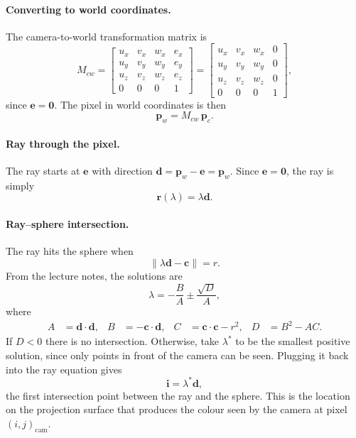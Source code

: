 \documentclass[11pt]{article}
\newcommand{\vect}[1]{\mathbf{#1}}
\begin{document}
\paragraph{Converting to world coordinates.}
The camera-to-world transformation matrix is
\[
  M_{cw} =
  \begin{bmatrix}
    u_x & v_x & w_x & e_x \\
    u_y & v_y & w_y & e_y \\
    u_z & v_z & w_z & e_z \\
    0   & 0   & 0   & 1
  \end{bmatrix}
  =
  \begin{bmatrix}
    u_x & v_x & w_x & 0 \\
    u_y & v_y & w_y & 0 \\
    u_z & v_z & w_z & 0 \\
    0   & 0   & 0   & 1
  \end{bmatrix},
\]
since $\vect{e} = \vect{0}$. The pixel in world coordinates is then
\[
  \vect{p}_w = M_{cw}\, \vect{p}_c.
\]

\paragraph{Ray through the pixel.}
The ray starts at $\vect{e}$ with direction $\vect{d} = \vect{p}_w - \vect{e} = \vect{p}_w$.
Since $\vect{e} = \vect{0}$, the ray is simply
\[
  \vect{r}(\lambda) = \lambda \vect{d}.
\]

\paragraph{Ray--sphere intersection.}
The ray hits the sphere when
\[
  \lVert \lambda \vect{d} - \vect{c} \rVert = r.
\]
From the lecture notes, the solutions are
\[
  \lambda = -\frac{B}{A} \pm \frac{\sqrt{D}}{A},
\]
where
\begin{align*}
  A &= \vect{d} \cdot \vect{d}, &
  B &= -\vect{c} \cdot \vect{d}, &
  C &= \vect{c} \cdot \vect{c} - r^2, &
  D &= B^2 - AC.
\end{align*}
If $D < 0$ there is no intersection. Otherwise, take $\lambda^*$ to be the smallest
positive solution, since only points in front of the camera can be seen. Plugging it back into the
ray equation gives
\[
  \vect{i} = \lambda^* \vect{d},
\]
the first intersection point between the ray and the sphere. This is the location on the
projection surface that produces the colour seen by the camera at pixel $(i,j)_{\text{cam}}$.
\end{document}
